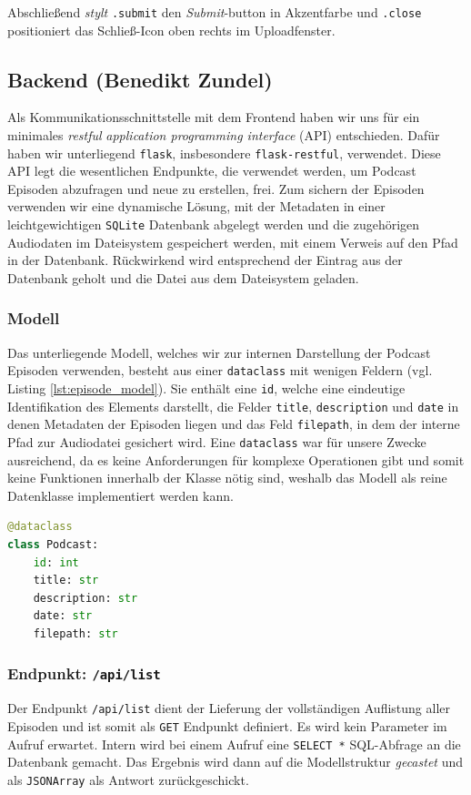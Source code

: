 \documentclass{article}
\begin{document}
Abschließend \textit{stylt} \texttt{.submit} den \textit{Submit}-button in Akzentfarbe und \texttt{.close} positioniert das Schließ-Icon oben rechts im Uploadfenster.



\subsection{Backend \small{(Benedikt Zundel)}}
Als Kommunikationsschnittstelle mit dem Frontend haben wir uns für ein minimales \textit{restful} \textit{application programming interface} (API) entschieden. Dafür haben wir unterliegend \texttt{flask}, insbesondere \texttt{flask-restful}, verwendet. Diese API legt die wesentlichen Endpunkte, die verwendet werden, um Podcast Episoden abzufragen und neue zu erstellen, frei. Zum sichern der Episoden verwenden wir eine dynamische Lösung, mit der Metadaten in einer leichtgewichtigen \texttt{SQLite} Datenbank abgelegt werden und die zugehörigen Audiodaten im Dateisystem gespeichert werden, mit einem Verweis auf den Pfad in der Datenbank. Rückwirkend wird entsprechend der Eintrag aus der Datenbank geholt und die Datei aus dem Dateisystem geladen.

\subsubsection{Modell}
Das unterliegende Modell, welches wir zur internen Darstellung der Podcast Episoden verwenden, besteht aus einer \texttt{dataclass} mit wenigen Feldern (vgl. Listing \ref{lst:episode_model}). Sie enthält eine \texttt{id}, welche eine eindeutige Identifikation des Elements darstellt, die Felder \texttt{title}, \texttt{description} und \texttt{date} in denen Metadaten der Episoden liegen und das Feld \texttt{filepath}, in dem der interne Pfad zur Audiodatei gesichert wird. Eine \texttt{dataclass} war für unsere Zwecke ausreichend, da es keine Anforderungen für komplexe Operationen gibt und somit keine Funktionen innerhalb der Klasse nötig sind, weshalb das Modell als reine Datenklasse implementiert werden kann.

\begin{lstlisting}[label=lst:episode_model, language=Python, caption=Implementation der Podcast-Episoden Klasse]
@dataclass
class Podcast:
    id: int
    title: str
    description: str
    date: str
    filepath: str
\end{lstlisting}

\subsubsection{Endpunkt: \texttt{/api/list}}
Der Endpunkt \texttt{/api/list} dient der Lieferung der vollständigen Auflistung aller Episoden und ist somit als \texttt{GET} Endpunkt definiert. Es wird kein Parameter im Aufruf erwartet. Intern wird bei einem Aufruf eine \texttt{SELECT *} SQL-Abfrage an die Datenbank gemacht. Das Ergebnis wird dann auf die Modellstruktur \textit{gecastet} und als \texttt{JSONArray} als Antwort zurückgeschickt.
\end{document}
